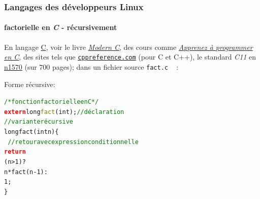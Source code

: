 \documentclass[xcolor=svgnames,final,smaller,a4]{beamer}
\begin{document}
\begin{frame}
  \frametitle{Langages des développeurs Linux}
  \framesubtitle{factorielle en \textit{C} - récursivement}

  \begin{relsize}{-0.5}
En langage \href{https://fr.wikipedia.org/wiki/C_(langage)}{C}, voir
le livre \href{https://modernc.gforge.inria.fr/}{\textit{Modern C}},
des cours comme
\href{https://openclassrooms.com/fr/courses/19980-apprenez-a-programmer-en-c}{\textit{Apprenez
    à programmer en C}}, des sites tels que
\href{https://en.cppreference.com/w/}{\texttt{cppreference.com}} (pour
C et C++), le standard \textit{C11} en
\href{http://www.open-std.org/jtc1/sc22/wg14/www/docs/n1570.pdf}{n1570}
(sur 700 pages); dans un fichier source \texttt{fact.c} ~ :
  \end{relsize}

  \vspace{0.3cm}
  
 Forme récursive:
  \begin{alltt}
    \textcolor{green}{/*fonction factorielle en C*/}\\
    \textcolor{red}{\textbf{extern}} long \textcolor{Olive}{fact}(int);  \textcolor{green}{//déclaration}\\
    \textcolor{green}{//variante récursive}\\
    long fact(int n) \{\\    
    ~ \textcolor{green}{//retour avec expression conditionnelle}\\
    \hspace{0.5cm}  \textcolor{red}{\textbf{return}} \\
    \hspace{1cm} (n > 1) ?\\
    \hspace{1cm} n*fact(n-1) :\\
    \hspace{1cm} 1;\\
    \}
  \end{alltt}

\end{frame}
\end{document}
